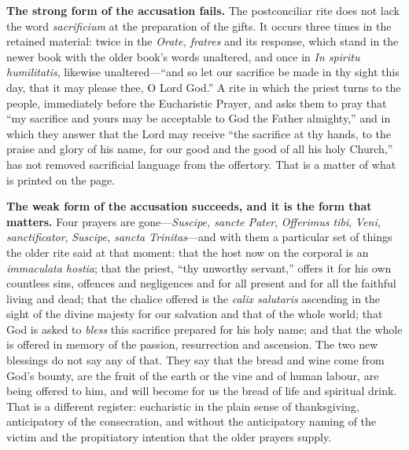 \textbf{The strong form of the accusation fails.} The postconciliar rite does not lack the word \emph{sacrificium} at the preparation of the gifts. It occurs three times in the retained material: twice in the \emph{Orate, fratres} and its response, which stand in the newer book with the older book's words unaltered, and once in \emph{In spiritu humilitatis}, likewise unaltered---``and so let our sacrifice be made in thy sight this day, that it may please thee, O Lord God.'' A rite in which the priest turns to the people, immediately before the Eucharistic Prayer, and asks them to pray that ``my sacrifice and yours may be acceptable to God the Father almighty,'' and in which they answer that the Lord may receive ``the sacrifice at thy hands, to the praise and glory of his name, for our good and the good of all his holy Church,'' has not removed sacrificial language from the offertory. That is a matter of what is printed on the page.

\textbf{The weak form of the accusation succeeds, and it is the form that matters.} Four prayers are gone---\emph{Suscipe, sancte Pater}, \emph{Offerimus tibi}, \emph{Veni, sanctificator}, \emph{Suscipe, sancta Trinitas}---and with them a particular set of things the older rite said at that moment: that the host now on the corporal is an \emph{immaculata hostia}; that the priest, ``thy unworthy servant,'' offers it for his own countless sins, offences and negligences and for all present and for all the faithful living and dead; that the chalice offered is the \emph{calix salutaris} ascending in the sight of the divine majesty for our salvation and that of the whole world; that God is asked to \emph{bless} this sacrifice prepared for his holy name; and that the whole is offered in memory of the passion, resurrection and ascension. The two new blessings do not say any of that. They say that the bread and wine come from God's bounty, are the fruit of the earth or the vine and of human labour, are being offered to him, and will become for us the bread of life and spiritual drink. That is a different register: eucharistic in the plain sense of thanksgiving, anticipatory of the consecration, and without the anticipatory naming of the victim and the propitiatory intention that the older prayers supply.

